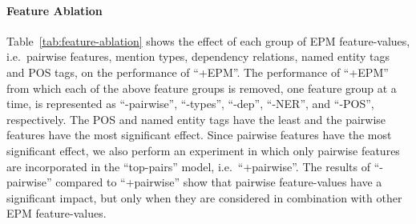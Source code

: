 \paragraph{Feature Ablation}
Table~\ref{tab:feature-ablation} shows the effect of each group of EPM feature-values, i.e.\ pairwise features, mention types, 
dependency relations, named entity tags and POS tags, on the performance of ``+EPM''.
The performance of ``+EPM'' from which each of the above feature groups is removed, one feature group at a time, 
is represented as ``-pairwise'', ``-types'', ``-dep'', ``-NER'', and ``-POS'', respectively.
The POS and named entity tags have the least 
and the pairwise features have the most significant effect.
Since pairwise features have the most significant effect, 
we also perform an experiment in which only pairwise features are incorporated in the ``top-pairs'' model, i.e.\ ``+pairwise''.
The results of ``-pairwise'' compared to ``+pairwise'' show that pairwise feature-values 
have a significant impact, but only when they are considered in combination with other EPM feature-values.
%

%